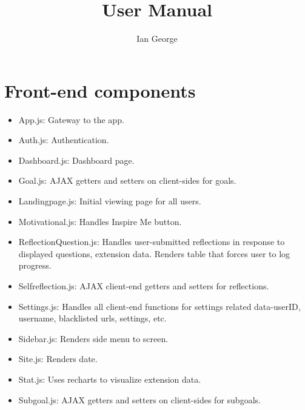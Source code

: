 \documentclass[letterpaper, 10 pt]{report}
\begin{document}
\title{User Manual}
\author{Ian George}
\maketitle
\pagestyle{empty}

\tableofcontents
\newpage

\section{Front-end components}
\begin{itemize}
\item App.js: Gateway to the app.
\item Auth.js: Authentication.
\item Dashboard.js: Dashboard page.
\item Goal.js: AJAX getters and setters on client-sides for goals.
\item Landingpage.js: Initial viewing page for all users.
\item Motivational.js: Handles Inspire Me button.
\item ReflectionQuestion.js: Handles user-submitted reflections in response to displayed questions, extension data. Renders table that forces user to log progress.
\item Selfreflection.js: AJAX client-end getters and setters for reflections.
\item Settings.js: Handles all client-end functions for settings related data-userID, username, blacklisted urls, settings, etc.
\item Sidebar.js: Renders side menu to screen.
\item Site.js: Renders date.
\item Stat.js: Uses recharts to visualize extension data.
\item Subgoal.js: AJAX getters and setters on client-sides for subgoals.
\end{itemize}


\newpage

\end{document}
